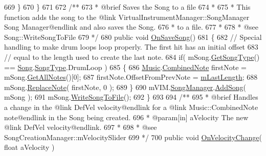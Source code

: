 \begin{DoxyCodeInclude}
669         \}
670     \}
671 \textcolor{comment}{}
672 \textcolor{comment}{    /**}
673 \textcolor{comment}{     * @brief Saves the Song to a file}
674 \textcolor{comment}{     * }
675 \textcolor{comment}{     * This function adds the song to the @link VirtualInstrumentManager::SongManager Song Manager@endlink
       and also saves the Song.}
676 \textcolor{comment}{     * to a file.}
677 \textcolor{comment}{     * }
678 \textcolor{comment}{     * @see Song::WriteSongToFile}
679 \textcolor{comment}{    */}
680     \textcolor{keyword}{public} \textcolor{keywordtype}{void} \hyperlink{group___s_c_m_handlers_gafd5e9f72e7a15cb77994c59fbbf8b769}{OnSaveSong}()
681     \{
682         \textcolor{comment}{// Special handling to make drum loops loop properly. The first hit has an initial offset}
683         \textcolor{comment}{// equal to the length used to create the last note.}
684         \textcolor{keywordflow}{if}( mSong.\hyperlink{group___song_pub_func_gabae5b5d8f727b2d9da7867a99347f86b}{GetSongType}() == \hyperlink{class_song}{Song}.\hyperlink{group___song_enums_gae681a1f001333e39fc1cb4fea97bfe1b}{SongType}.DrumLoop )
685         \{
686             \hyperlink{class_music}{Music}.\hyperlink{group___music_structs_struct_music_1_1_combined_note}{CombinedNote} firstNote = mSong.\hyperlink{group___song_pub_func_ga842675b7691fca074ee394031afc7675}{GetAllNotes}()[0];
687             firstNote.OffsetFromPrevNote = \hyperlink{group___s_c_m_priv_var_gaa137adb1c99e9ee59adcfbf7d0cf6249}{mLastLength};
688             mSong.\hyperlink{group___song_pub_func_ga326d61c75339080057a02c6decb0cde3}{ReplaceNote}( firstNote, 0 );
689         \}
690         mVIM.\hyperlink{group___v_i_m_pub_ga33dae94932c10c66db76a0eebec76b01}{SongManager}.\hyperlink{group___s_m_pub_func_ga1a228cb2a64e55448ccf9d1d618f05b7}{AddSong}( mSong );
691         mSong.\hyperlink{group___song_pub_func_ga70b0f6021c3b0590c561a88e3d1e5c2f}{WriteSongToFile}();
692     \}
693 \textcolor{comment}{}
694 \textcolor{comment}{    /** }
695 \textcolor{comment}{     * @brief Handles a change in the @link DefVel velocity@endlink for a @link Music::CombinedNote
       note@endlink in the Song being created.}
696 \textcolor{comment}{     * @param[in] aVelocity The new @link DefVel velocity@endlink.}
697 \textcolor{comment}{     * }
698 \textcolor{comment}{     * @see SongCreationManager::mVelocitySlider}
699 \textcolor{comment}{    */}
700     \textcolor{keyword}{public} \textcolor{keywordtype}{void} \hyperlink{group___s_c_m_handlers_ga45e79bb31be34e3e2cc47bd6a6563b40}{OnVelocityChange}( \textcolor{keywordtype}{float} aVelocity )

\end{DoxyCodeInclude}
